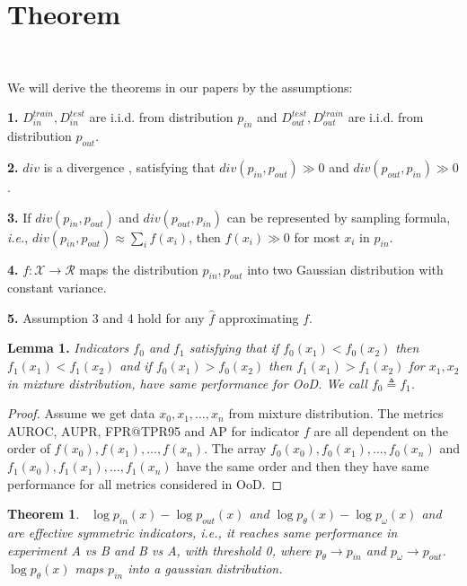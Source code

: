 \documentclass[a3paper]{article}
\newtheorem{theorem}{Theorem}
\newtheorem*{proof}{\it{Proof.}\rm}
\newcommand{\IE}{\textit{i.e.}, }
\newcommand{\pin}{p_{in}}
\newcommand{\pout}{p_{out}}
\begin{document}

\section{Theorem}~\label{app:c}

We will derive the theorems in our papers by the assumptions:

\noindent \textbf{1.} $D^{train}_{in}, D^{test}_{in}$ are i.i.d. from distribution $\pin$ and $D^{test}_{out}, D^{train}_{out}$ are i.i.d. from distribution $\pout$.

\noindent \textbf{2.}  $div$ is a divergence , satisfying that $div(\pin, \pout) \gg 0$ and $div(\pout, \pin) \gg 0$.

\noindent \textbf{3.}  If $div(\pin, \pout)$ and $div(\pout, \pin)$ can be represented by sampling formula, \IE $div(\pin, \pout) \approx \sum_{i} f(x_i)$, then $f(x_i) \gg 0$ for most $x_i$ in $\pin$.

\noindent \textbf{4.} $f: \mathcal{X} \rightarrow \mathcal{R}$ maps the distribution $\pin, \pout$ into two Gaussian distribution with constant variance.

\noindent \textbf{5.} Assumption 3 and 4 hold for any $\hat{f}$ approximating $f$.

\textbf{Lemma 1.}\textit{
	Indicators $f_0$ and $f_1$ satisfying that if $f_0(x_1) < f_0(x_2)$ then $f_1(x_1) < f_1(x_2)$ and if $f_0(x_1) > f_0(x_2)$ then $f_1(x_1) > f_1(x_2)$ for $x_1, x_2$ in mixture distribution, have same performance for OoD. We call $f_0 \triangleq f_1$. 
}

\begin{proof}\rm
	Assume we get data $x_0, x_1, \ldots, x_n$ from mixture distribution. The metrics AUROC, AUPR, FPR@TPR95 and AP for indicator $f$ are all dependent on the order of $f(x_0), f(x_1), \ldots, f(x_n)$. The array $f_0(x_0), f_0(x_1), \ldots, f_0(x_n)$ and $f_1(x_0), f_1(x_1), \ldots, f_1(x_n)$ have the same order and then they have same performance for all metrics considered in OoD. 
\end{proof}

\begin{theorem}~\label{thm1}
	$\log \pin(x) - \log \pout(x)$ and $\log p_\theta(x) - \log p_\omega(x)$ and are effective symmetric indicators, \IE it reaches same performance in experiment A vs B and B vs A, with threshold 0, where $p_\theta \rightarrow \pin$ and $p_\omega \rightarrow \pout$. $\log p_\theta(x)$ maps $\pin$ into a gaussian distribution. 
\end{theorem}
\end{document}
